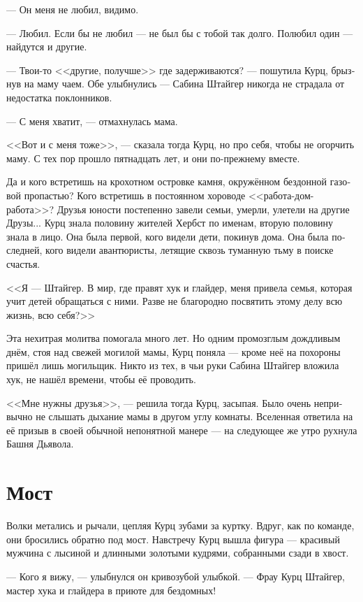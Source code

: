 \documentclass[a4paper,12pt,fleqn]{book}\usepackage{polyglossia}\setdefaultlanguage[babelshorthands=true]{russian}\setotherlanguage{english}\defaultfontfeatures{Ligatures=TeX,Mapping=tex-text}\usepackage{xcolor}\newcommand{\ml}[3]{#2}
\begin{document}
--- Он меня не любил, видимо.

--- Любил.
Если бы не любил --- не был бы с тобой так долго.
Полюбил один --- найдутся и другие.

--- Твои-то <<другие, получше>> где задерживаются? --- пошутила Курц, брызнув на маму чаем.
Обе улыбнулись --- Сабина Штайгер никогда не страдала от недостатка поклонников.

--- С меня хватит, --- отмахнулась мама.

<<Вот и с меня тоже>>, --- сказала тогда Курц, но про себя, чтобы не огорчить маму.
С тех пор прошло пятнадцать лет, и они по-прежнему вместе.

Да и кого встретишь на крохотном островке камня, окружённом бездонной газовой пропастью?
Кого встретишь в постоянном хороводе <<работа-дом-работа>>?
Друзья юности постепенно завели семьи, умерли, улетели на другие Друзы...
Курц знала половину жителей Хербст по именам, вторую половину знала в лицо.
Она была первой, кого видели дети, покинув дома.
Она была последней, кого видели авантюристы, летящие сквозь туманную тьму в поиске счастья.

<<Я --- Штайгер.
В мир, где правят хук и глайдер, меня привела семья, которая учит детей обращаться с ними.
Разве не благородно посвятить этому делу всю жизнь, всю себя?>>

Эта нехитрая молитва помогала много лет.
Но одним промозглым дождливым днём, стоя над свежей могилой мамы, Курц поняла --- кроме неё на похороны пришёл лишь могильщик.
Никто из тех, в чьи руки Сабина Штайгер вложила хук, не нашёл времени, чтобы её проводить.

<<Мне нужны друзья>>, --- решила тогда Курц, засыпая.
Было очень непривычно не слышать дыхание мамы в другом углу комнаты.
Вселенная ответила на её призыв в своей обычной непонятной манере --- на следующее же утро рухнула Башня Дьявола.

\section{Мост}

Волки метались и рычали, цепляя Курц зубами за куртку.
Вдруг, как по команде, они бросились обратно под мост.
Навстречу Курц вышла фигура --- красивый мужчина с лысиной и длинными золотыми кудрями, собранными сзади в хвост.

--- Кого я вижу, --- улыбнулся он кривозубой улыбкой.
--- Фрау Курц Штайгер, мастер хука и глайдера в приюте для бездомных!
\end{document}
